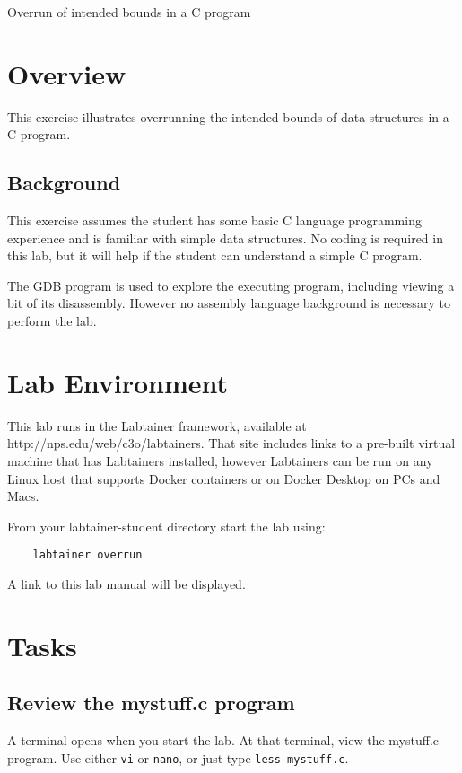 


\begin{center}
{\LARGE Overrun of intended bounds in a C program}
\vspace{0.1in}\\
\end{center}


\section{Overview}
This exercise illustrates overrunning the intended bounds of
data structures in a C program.

\subsection{Background}
This exercise assumes the student has some basic C language programming
experience and is familiar with simple data structures.
No coding is required in this lab, but it will help if the student
can understand a simple C program.

The GDB program is used to explore the executing program, including viewing
a bit of its disassembly.  However no assembly language background is necessary to perform
the lab.

\section{Lab Environment}
This lab runs in the Labtainer framework,
available at http://nps.edu/web/c3o/labtainers.
That site includes links to a pre-built virtual machine
that has Labtainers installed, however Labtainers can
be run on any Linux host that supports Docker containers
or on Docker Desktop on PCs and Macs.

From your labtainer-student directory start the lab using:
\begin{verbatim}
    labtainer overrun
\end{verbatim}
A link to this lab manual will be displayed.


\section{Tasks}

\subsection{Review the mystuff.c program}
A terminal opens when you start the lab.  At that terminal, view the mystuff.c program.  Use either {\tt vi} or {\tt nano}, or just type {\tt less mystuff.c}.

